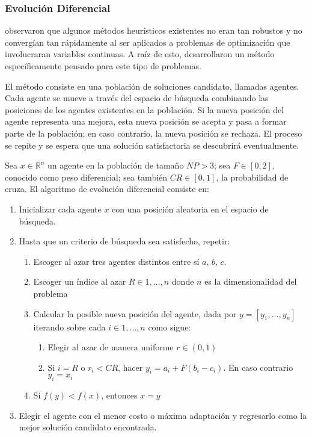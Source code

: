 \subsubsection{Evolución Diferencial}

\citeauthor{Storn1997} \citep{Storn1997} observaron que algunos métodos heurísticos existentes no eran tan robustos y no convergían tan rápidamente al ser aplicados a problemas de optimización que involucraran variables continuas. A raíz de esto, desarrollaron un método específicamente pensado para este tipo de problemas. 

El método consiste en una población de soluciones candidato, llamadas agentes. Cada agente se mueve a través del espacio de búsqueda combinando las posiciones de los agentes existentes en la población. Si la nueva posición del agente representa una mejora, esta nueva posición se acepta y pasa a formar parte de la población; en caso contrario, la nueva posición se rechaza. El proceso se repite y se espera que una solución satisfactoria se descubrirá eventualmente.

Sea $x \in \mathbb{R}^n$ un agente en la población de tamaño $NP>3$; sea $F \in [0,2]$, conocido como peso diferencial; sea también $CR \in [0,1]$, la probabilidad de cruza. El algoritmo de evolución diferencial consiste en:
\begin{enumerate}
\item Inicializar cada agente $x$ con una posición aleatoria en el espacio de búsqueda.
\item Hasta que un criterio de búsqueda sea satisfecho, repetir:
	\begin{enumerate}
		\item Escoger al azar tres agentes distintos entre sí $a$, $b$, $c$.
		\item Escoger un índice al azar $R \in {1,\ldots,n}$ donde $n$ es la dimensionalidad del problema
		\item Calcular la posible nueva posición del agente, dada por $y=[y_1,\ldots,y_n]$ iterando sobre cada $i \in {1,\ldots,n}$ como sigue:
			\begin{enumerate}
				\item Elegir al azar de manera uniforme $r \in (0,1)$
				\item Si $i=R$ o $r_i<CR$, hacer $y_i=a_i+F(b_i-c_i)$. En caso contrario $y_i=x_i$
			\end{enumerate}
		\item Si $f(y)<f(x)$, entonces $x=y$
	\end{enumerate}
\item Elegir el agente con el menor costo o máxima adaptación y regresarlo como la mejor solución candidato encontrada.
\end{enumerate}

